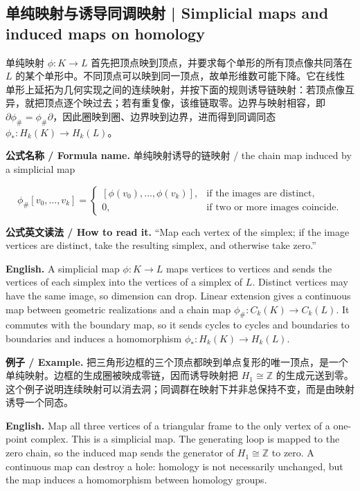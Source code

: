 \documentclass[UTF8,11pt,a4paper]{ctexart}
\newcommand{\EN}[1]{\par\noindent\textbf{English.} #1\par}
\newcommand{\READ}[1]{\par\noindent\textbf{公式英文读法 / How to read it.} #1\par}
\newcommand{\FORMULA}[2]{\par\noindent\textbf{公式名称 / Formula name.} #1 / #2\par}
\newcommand{\EX}[2]{\par\noindent\textbf{例子 / Example.} #1\par\EN{#2}}
\begin{document}
\subsection{单纯映射与诱导同调映射 | Simplicial maps and induced maps on homology}
\noindent 单纯映射 $\phi:K\to L$ 首先把顶点映到顶点，并要求每个单形的所有顶点像共同落在 $L$ 的某个单形中。不同顶点可以映到同一顶点，故单形维数可能下降。它在线性单形上延拓为几何实现之间的连续映射，并按下面的规则诱导链映射：若顶点像互异，就把顶点逐个映过去；若有重复像，该维链取零。边界与映射相容，即 $\partial\phi_\#=\phi_\#\partial$，因此圈映到圈、边界映到边界，进而得到同调同态 $\phi_*:H_k(K)\to H_k(L)$。
\FORMULA{单纯映射诱导的链映射}{the chain map induced by a simplicial map}
\[
\phi_\#[v_0,\ldots,v_k]=
\begin{cases}
[\phi(v_0),\ldots,\phi(v_k)],&\text{if the images are distinct},\\
0,&\text{if two or more images coincide}.
\end{cases}
\]
\READ{“Map each vertex of the simplex; if the image vertices are distinct, take the resulting simplex, and otherwise take zero.”}
\EN{A simplicial map $\phi:K\to L$ maps vertices to vertices and sends the vertices of each simplex into the vertices of a simplex of $L$. Distinct vertices may have the same image, so dimension can drop. Linear extension gives a continuous map between geometric realizations and a chain map $\phi_\#:C_k(K)\to C_k(L)$. It commutes with the boundary map, so it sends cycles to cycles and boundaries to boundaries and induces a homomorphism $\phi_*:H_k(K)\to H_k(L)$.}
\EX{把三角形边框的三个顶点都映到单点复形的唯一顶点，是一个单纯映射。边框的生成圈被映成零链，因而诱导映射把 $H_1\cong\mathbb Z$ 的生成元送到零。这个例子说明连续映射可以消去洞；同调群在映射下并非总保持不变，而是由映射诱导一个同态。}{Map all three vertices of a triangular frame to the only vertex of a one-point complex. This is a simplicial map. The generating loop is mapped to the zero chain, so the induced map sends the generator of $H_1\cong\mathbb Z$ to zero. A continuous map can destroy a hole: homology is not necessarily unchanged, but the map induces a homomorphism between homology groups.}
\end{document}
